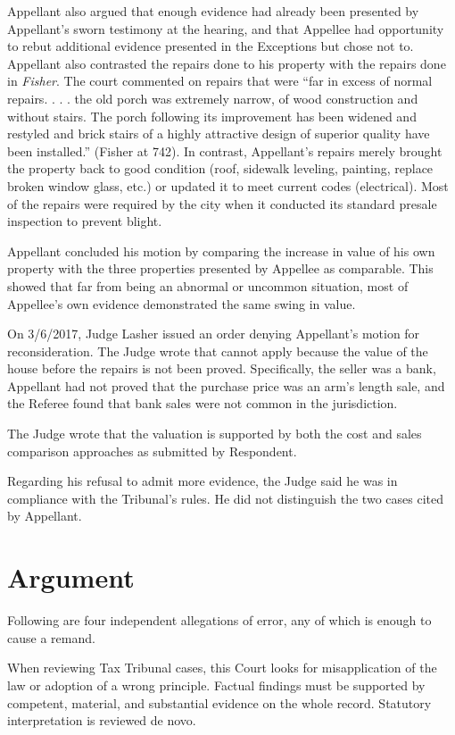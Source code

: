 \documentclass[12pt,\documentclassflag]{michiganCourtOfAppealsBrief}
\begin{document}
Appellant also argued that enough evidence had already been presented by Appellant's sworn testimony at the hearing, and that Appellee had opportunity to rebut additional evidence presented in the Exceptions but chose not to.
Appellant also contrasted the repairs done to his property with the repairs done in \textit{Fisher}. The court commented on repairs that were ``far in excess of normal repairs. . . . the old porch was extremely narrow, of wood construction and without stairs. The porch following its improvement has been widened and restyled and brick stairs of a highly attractive design of superior quality have been installed.'' (Fisher at 742). In contrast, Appellant's repairs merely brought the property back to good condition (roof, sidewalk leveling, painting, replace broken window glass, etc.) or updated it to meet current codes (electrical). Most of the repairs were required by the city when it conducted its standard presale inspection to prevent blight.

Appellant concluded his motion by comparing the increase in value of his own property with the three properties presented by Appellee as comparable. This showed that far from being an abnormal or uncommon situation, most of Appellee's own evidence demonstrated the same swing in value. 

On 3/6/2017, Judge Lasher issued an order denying Appellant's motion for reconsideration. The Judge wrote that  cannot apply because the value of the house before the repairs is not been proved. Specifically, the seller was a bank, Appellant had not proved that the purchase price was an arm's length sale, and the Referee found that bank sales were not common in the jurisdiction. 

The Judge wrote that the valuation is supported by both the cost and sales comparison approaches as submitted by Respondent. 

Regarding his refusal to admit more evidence, the Judge said he was in compliance with the Tribunal's rules. He did not distinguish the two cases cited by Appellant. 



\section{Argument}

Following are four independent allegations of error, any of which is enough to cause a remand. 

When reviewing Tax Tribunal cases, this Court looks for misapplication of the law or adoption of a wrong principle. Factual findings must be supported by competent, material, and substantial evidence on the whole record. Statutory interpretation is reviewed de novo. 
\end{document}
